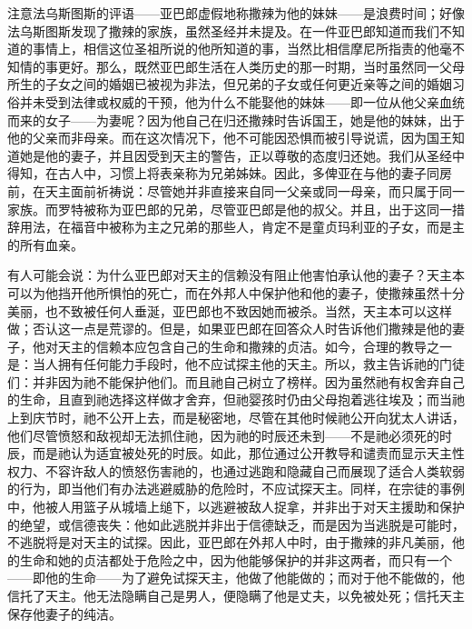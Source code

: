 注意法乌斯图斯的评语——亚巴郎虚假地称撒辣为他的妹妹——是浪费时间；好像法乌斯图斯发现了撒辣的家族，虽然圣经并未提及。在一件亚巴郎知道而我们不知道的事情上，相信这位圣祖所说的他所知道的事，当然比相信摩尼所指责的他毫不知情的事更好。那么，既然亚巴郎生活在人类历史的那一时期，当时虽然同一父母所生的子女之间的婚姻已被视为非法，但兄弟的子女或任何更近亲等之间的婚姻习俗并未受到法律或权威的干预，他为什么不能娶他的妹妹——即一位从他父亲血统而来的女子——为妻呢？因为他自己在归还撒辣时告诉国王，她是他的妹妹，出于他的父亲而非母亲。而在这次情况下，他不可能因恐惧而被引导说谎，因为国王知道她是他的妻子，并且因受到天主的警告，正以尊敬的态度归还她。我们从圣经中得知，在古人中，习惯上将表亲称为兄弟姊妹。因此，多俾亚在与他的妻子同房前，在天主面前祈祷说：尽管她并非直接来自同一父亲或同一母亲，而只属于同一家族。而罗特被称为亚巴郎的兄弟，尽管亚巴郎是他的叔父。并且，出于这同一措辞用法，在福音中被称为主之兄弟的那些人，肯定不是童贞玛利亚的子女，而是主的所有血亲。\par

有人可能会说：为什么亚巴郎对天主的信赖没有阻止他害怕承认他的妻子？天主本可以为他挡开他所惧怕的死亡，而在外邦人中保护他和他的妻子，使撒辣虽然十分美丽，也不致被任何人垂涎，亚巴郎也不致因她而被杀。当然，天主本可以这样做；否认这一点是荒谬的。但是，如果亚巴郎在回答众人时告诉他们撒辣是他的妻子，他对天主的信赖本应包含自己的生命和撒辣的贞洁。如今，合理的教导之一是：当人拥有任何能力手段时，他不应试探主他的天主。所以，救主告诉祂的门徒们：并非因为祂不能保护他们。而且祂自己树立了榜样。因为虽然祂有权舍弃自己的生命，且直到祂选择这样做才舍弃，但祂婴孩时仍由父母抱着逃往埃及；而当祂上到庆节时，祂不公开上去，而是秘密地，尽管在其他时候祂公开向犹太人讲话，他们尽管愤怒和敌视却无法抓住祂，因为祂的时辰还未到——不是祂必须死的时辰，而是祂认为适宜被处死的时辰。如此，那位通过公开教导和谴责而显示天主性权力、不容许敌人的愤怒伤害祂的，也通过逃跑和隐藏自己而展现了适合人类软弱的行为，即当他们有办法逃避威胁的危险时，不应试探天主。同样，在宗徒的事例中，他被人用篮子从城墙上缒下，以逃避被敌人捉拿，并非出于对天主援助和保护的绝望，或信德丧失：他如此逃脱并非出于信德缺乏，而是因为当逃脱是可能时，不逃脱将是对天主的试探。因此，亚巴郎在外邦人中时，由于撒辣的非凡美丽，他的生命和她的贞洁都处于危险之中，因为他能够保护的并非这两者，而只有一个——即他的生命——为了避免试探天主，他做了他能做的；而对于他不能做的，他信托了天主。他无法隐瞒自己是男人，便隐瞒了他是丈夫，以免被处死；信托天主保存他妻子的纯洁。\par

